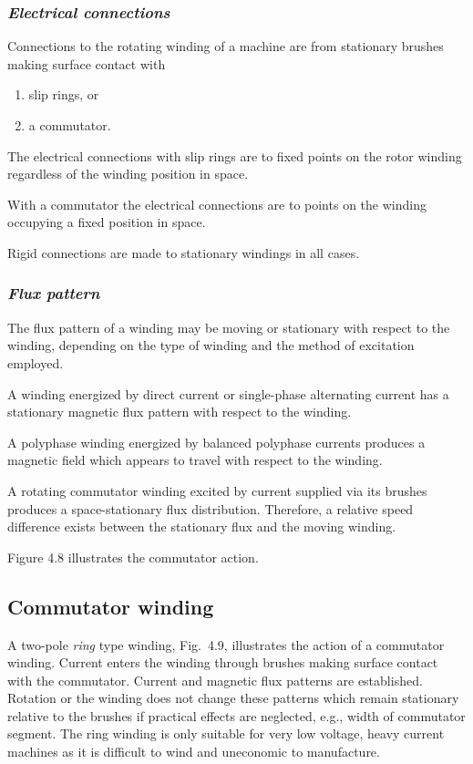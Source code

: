 \documentclass[a4paper,numbers=noenddot,12pt]{scrbook}
\begin{document}
            \subsubsection{\textit{Electrical connections}}
            Connections to the rotating winding of a machine are from stationary brushes making surface contact with
            \begin{enumerate}
                \item slip rings, or 
                \item a commutator.
            \end{enumerate}

            The electrical connections with slip rings are to fixed points on the rotor winding regardless of the winding position in space.

            With a commutator the electrical connections are to points on the winding occupying a fixed position in space.

            Rigid connections are made to stationary windings in all cases.

            \subsubsection{\textit{Flux pattern}}
            The flux pattern of a winding may be moving or stationary with respect to the winding, depending on the type of winding and the method of excitation employed. 

            A winding energized by direct current or single-phase alternating current has a stationary magnetic flux pattern with respect to the winding.

            A polyphase winding energized by balanced polyphase currents produces a magnetic field which appears to travel with respect to the winding.

            A rotating commutator winding excited by current supplied via its brushes produces a space-stationary flux distribution. Therefore, a relative speed difference exists between the stationary flux and the moving winding.

            Figure 4.8 illustrates the commutator action.

            \subsection{Commutator winding}
            A two-pole \textit{ring} type winding, Fig.\ 4.9, illustrates the action of a commutator winding. Current enters the winding through brushes making surface contact with the commutator. Current and magnetic flux patterns are established. Rotation or the winding does not change these patterns which remain stationary relative to the brushes if practical effects are neglected, e.g., width of commutator segment. The ring winding is only suitable for very low voltage,
            heavy current machines as it is difficult to wind and uneconomic to manufacture.
\end{document}
